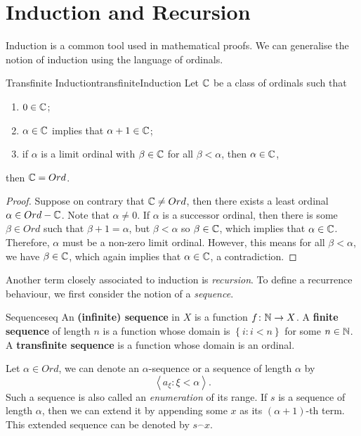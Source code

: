 \documentclass[math]{amznotes}
\theoremstyle{remark}
\begin{document}
\section{Induction and Recursion}
Induction is a common tool used in mathematical proofs. We can generalise the notion of induction using the language of ordinals.
\begin{thmbox}{Transfinite Induction}{transfiniteInduction}
    Let $\mathbb{C}$ be a class of ordinals such that
    \begin{enumerate}
        \item $0 \in \mathbb{C}$;
        \item $\alpha \in \mathbb{C}$ implies that $\alpha + 1 \in \mathbb{C}$;
        \item if $\alpha$ is a limit ordinal with $\beta \in \mathbb{C}$ for all $\beta < \alpha$, then $\alpha \in \mathbb{C}$,
    \end{enumerate}
    then $\mathbb{C} = Ord$.
    \tcblower
    \begin{proof}
        Suppose on contrary that $\mathbb{C} \neq Ord$, then there exists a least ordinal $\alpha \in Ord - \mathbb{C}$. Note that $\alpha \neq 0$. If $\alpha$ is a successor ordinal, then there is some $\beta \in Ord$ such that $\beta + 1 = \alpha$, but $\beta < \alpha$ so $\beta \in \mathbb{C}$, which implies that $\alpha \in \mathbb{C}$. Therefore, $\alpha$ must be a non-zero limit ordinal. However, this means for all $\beta < \alpha$, we have $\beta \in \mathbb{C}$, which again implies that $\alpha \in \mathbb{C}$, a contradiction.
    \end{proof}
\end{thmbox}
Another term closely associated to induction is \textit{recursion}. To define a recurrence behaviour, we first consider the notion of a \textit{sequence}.
\begin{dfnbox}{Sequence}{seq}
    An {\color{red} \textbf{(infinite) sequence}} in $X$ is a function $f \colon \mathbb{N} \to X$. A {\color{red} \textbf{finite sequence}} of length $n$ is a function whose domain is $\left\{i \colon i < n\right\}$ for some $n \in \mathbb{N}$. A {\color{red} \textbf{transfinite sequence}} is a function whose domain is an ordinal.
\end{dfnbox}
Let $\alpha \in Ord$, we can denote an $\alpha$-sequence or a sequence of length $\alpha$ by
\begin{equation*}
    \left\langle a_\xi \colon \xi < \alpha \right\rangle.
\end{equation*}
Such a sequence is also called an \textit{enumeration} of its range. If $s$ is a sequence of length $\alpha$, then we can extend it by appending some $x$ as its $(\alpha + 1)$-th term. This extended sequence can be denoted by $s \overset{\frown}{} x$.
\end{document}

